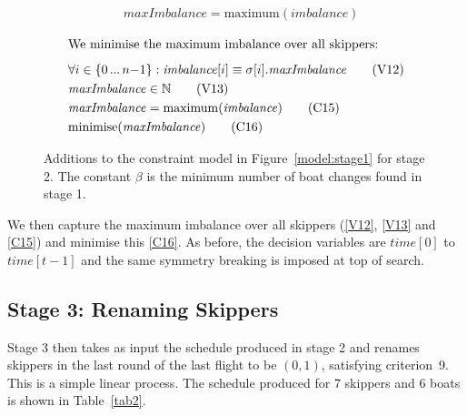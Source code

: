 \documentclass{llncs}
\newcommand{\imbalance}{\mathit{imbalance}}
\newcommand{\maxImbalance}{\mathit{maxImbalance}}
\newcommand{\timeVar}{\mathit{time}}
\newcommand{\minimise}{\mathrm{minimise}}
\newcommand{\maximum}{\mathrm{maximum}}
\newcommand\nldots{\,\hbox to 0.8em{.\hss.\hss.}\,}
\begin{document}
\begin{figure}[tb]
\begin{framed}
\begin{align}
    & \maxImbalance = \maximum(imbalance) \label{C14} \tag{C14}
\end{align}
\end{framed}\begin{framed}
\begin{align}
    \intertext{We minimise the maximum imbalance over all skippers:\smallskip}
    & \forall i \in \{ 0 \nldots n{-}1 \} : \imbalance[{i}] \equiv \sigma[{i}].\maxImbalance \label{V12} \tag{V12} \\
    & \maxImbalance \in \mathbb{N} \label{V13} \tag{V13} \\
    & \maxImbalance = \maximum(\imbalance) \label{C15} \tag{C15} \\
    & \minimise(\maxImbalance) \label{C16} \tag{C16}
\end{align}
\end{framed}
\caption{Additions to the constraint model in Figure~\ref{model:stage1} for stage 2. The constant
$\beta$ is the minimum number of boat changes found in stage 1.}\label{model:stage2}
\end{figure}

We then capture the maximum imbalance over all skippers (\ref{V12}, \ref{V13} and \ref{C15}) and
minimise this \eqref{C16}. As before, the decision variables are $\timeVar[{0}]$ to
$\timeVar[{t-1}]$ and the same symmetry breaking is imposed at top of search.

\subsection{Stage 3: Renaming Skippers}

Stage 3 then takes as input the schedule produced in stage 2 and renames skippers in the last round
of the last flight to be $(0,1)$, satisfying criterion~9. This is a simple linear process. The
schedule produced for 7 skippers and 6 boats is shown in Table~\ref{tab2}.
\end{document}
